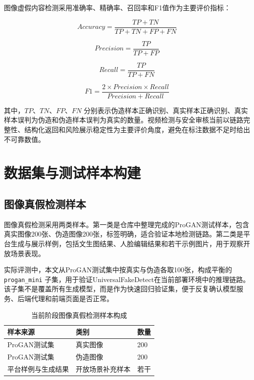 图像虚假内容检测采用准确率、精确率、召回率和F1值作为主要评价指标：

\begin{equation}
Accuracy = \frac{TP + TN}{TP + TN + FP + FN}
\end{equation}

\begin{equation}
Precision = \frac{TP}{TP + FP}
\end{equation}

\begin{equation}
Recall = \frac{TP}{TP + FN}
\end{equation}

\begin{equation}
F1 = \frac{2 \times Precision \times Recall}{Precision + Recall}
\end{equation}

其中，$TP$、$TN$、$FP$、$FN$ 分别表示伪造样本正确识别、真实样本正确识别、真实样本误判为伪造和伪造样本误判为真实的数量。视频检测与安全审核当前以链路完整性、结构化返回和风险展示稳定性为主要评价角度，避免在标注数据不足时给出不可靠数值。

\section{数据集与测试样本构建}

\subsection{图像真假检测样本}

图像真假检测采用两类样本。第一类是仓库中整理完成的ProGAN测试样本，包含真实图像200张、伪造图像200张，标签明确，适合验证本地检测链路。第二类是平台生成与展示样例，包括文生图结果、人脸编辑结果和若干示例图片，用于观察开放场景表现。

实际评测中，本文从ProGAN测试集中按真实与伪造各取100张，构成平衡的 \texttt{progan\_mini} 子集，用于验证UniversalFakeDetect在当前部署环境中的推理链路。该子集不是覆盖所有生成模型，而是作为快速回归验证集，便于反复确认模型服务、后端代理和前端页面是否正常。

\begin{table}[H]
\centering
\caption{当前阶段图像真假检测样本构成}
\renewcommand{\arraystretch}{1.35}
\begin{tabular}{|C{5.0cm}|C{5.0cm}|C{2.4cm}|}
\hline
\textbf{样本来源} & \textbf{类别} & \textbf{数量} \\
\hline
ProGAN测试集 & 真实图像 & 200 \\
\hline
ProGAN测试集 & 伪造图像 & 200 \\
\hline
平台样例与生成结果 & 开放场景补充样本 & 若干 \\
\hline
\end{tabular}
\end{table}

